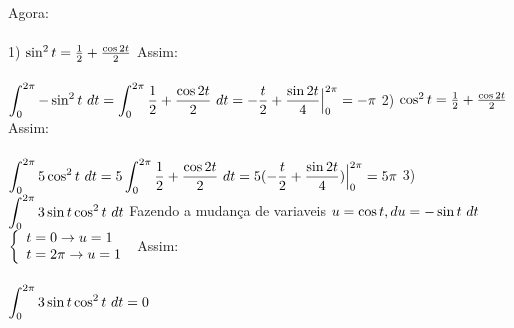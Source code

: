 \documentclass[11pt,a4paper]{article}
\newcommand{\integral}{\displaystyle\int}
\begin{document}
\begin{enumerate}
{{                        Agora:\\\\
                        1) $\sin^2 t = \frac{1}{2} + \frac{\cos 2t}{2}\\\\$
                        Assim:\\\\
                        $\integral_{0}^{2\pi} - \sin^2 t\ dt = \integral_{0}^{2\pi} \frac{1}{2} + \frac{\cos 2t}{2} \ dt\\\\
                        = -\frac{t}{2} + \frac{\sin 2t}{4} \Big|_{0}^{2\pi}\\\\
                        =-\pi\\\\$
                        2) $\cos^2 t = \frac{1}{2} + \frac{\cos 2t}{2}\\\\$
		                Assim:\\\\
                        $\integral_{0}^{2\pi} 5\cos^2 t\ dt = 5\integral_{0}^{2\pi} \frac{1}{2} + \frac{\cos 2t}{2} \ dt\\\\
                        = 5(-\frac{t}{2} + \frac{\sin 2t}{4})\Big|_{0}^{2\pi}\\\\
                        =5\pi\\\\$
                        3) $\integral_{0}^{2\pi} 3\sin t\cos^2 t \ dt\\\\$
                        Fazendo a mudança de variaveis $u=\cos t, du = -\sin t \ dt\\\\$
                        $\left\{
                        \begin{array}{ll}
                        t = 0 \rightarrow u = 1\\
                        t = 2\pi \rightarrow u =1\\
                        \end{array}
                        \right.\\\\$
                        Assim:\\\\
                        $\integral_{0}^{2\pi} 3\sin t\cos^2 t\ dt =0\\\\$
}}
\end{enumerate}
\end{document}
